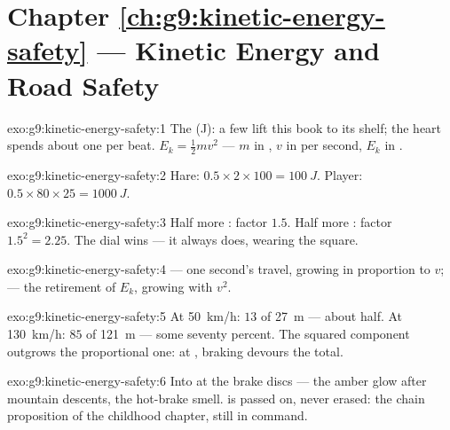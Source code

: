 \section*{Chapter \ref{ch:g9:kinetic-energy-safety} --- Kinetic Energy and Road Safety}

\begin{solution}{exo:g9:kinetic-energy-safety:1}
The  (\unit{J}): a few  lift this book to its
shelf; the heart spends about one per beat. $E_k = \frac12 m
v^2$ --- $m$ in , $v$ in  per second, $E_k$ in
.
\end{solution}

\begin{solution}{exo:g9:kinetic-energy-safety:2}
Hare: $0.5 \times 2 \times 100 = \qty{100}{J}$. Player: $0.5
\times 80 \times 25 = \qty{1000}{J}$.
\end{solution}

\begin{solution}{exo:g9:kinetic-energy-safety:3}
Half more : factor $1.5$. Half more : factor $1.5^2
= 2.25$. The  dial wins --- it always does, wearing the
square.
\end{solution}

\begin{solution}{exo:g9:kinetic-energy-safety:4}
 --- one second's travel, growing in
proportion to $v$;  --- the retirement of
$E_k$, growing with $v^2$.
\end{solution}

\begin{solution}{exo:g9:kinetic-energy-safety:5}
At \qty{50}{km/h}: $13$ of \qty{27}{m} --- about half. At
\qty{130}{km/h}: $85$ of \qty{121}{m} --- some seventy
percent. The squared component outgrows the proportional one:
at , braking devours the total.
\end{solution}

\begin{solution}{exo:g9:kinetic-energy-safety:6}
Into  at the brake discs --- the amber glow after
mountain descents, the hot-brake smell.  is passed on,
never erased: the chain proposition of the childhood 
chapter, still in command.
\end{solution}

